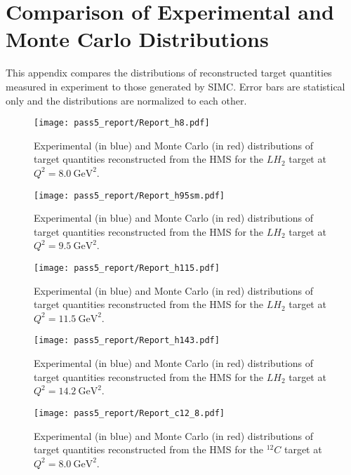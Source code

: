 \chapter{Comparison of Experimental and Monte Carlo Distributions} \label{app:distributions}
This appendix compares the distributions of reconstructed target quantities
measured in experiment to those generated by SIMC.
Error bars are statistical only and the distributions are normalized to each
other.
\begin{figure}[!h]
    \centering
    \texttt{[image: pass5\_report/Report\_h8.pdf]}
    \caption{
            Experimental (in blue) and Monte Carlo (in red) distributions of
            target quantities reconstructed from the HMS for
            the $LH_2$ target at $Q^2=\SI{8.0}{\giga\electronvolt\squared}$.
            }
    \label{fig:Report_h8.pdf_pg1}
\end{figure}


\begin{figure}[!h]
    \centering
    \texttt{[image: pass5\_report/Report\_h95sm.pdf]}
    \caption{
            Experimental (in blue) and Monte Carlo (in red) distributions of
            target quantities reconstructed from the HMS for
            the $LH_2$ target at $Q^2=\SI{9.5}{\giga\electronvolt\squared}$.
            }
    \label{fig:Report_h95sm.pdf_pg1}
\end{figure}


\begin{figure}[!h]
    \centering
    \texttt{[image: pass5\_report/Report\_h115.pdf]}
    \caption{
            Experimental (in blue) and Monte Carlo (in red) distributions of
            target quantities reconstructed from the HMS for
            the $LH_2$ target at $Q^2=\SI{11.5}{\giga\electronvolt\squared}$.
            }
    \label{fig:Report_h115.pdf_pg1}
\end{figure}


\begin{figure}[!h]
    \centering
    \texttt{[image: pass5\_report/Report\_h143.pdf]}
    \caption{
            Experimental (in blue) and Monte Carlo (in red) distributions of
            target quantities reconstructed from the HMS for
            the $LH_2$ target at $Q^2=\SI{14.2}{\giga\electronvolt\squared}$.
            }
    \label{fig:Report_h143.pdf_pg1}
\end{figure}


\begin{figure}[!h]
    \centering
    \texttt{[image: pass5\_report/Report\_c12\_8.pdf]}
    \caption{
            Experimental (in blue) and Monte Carlo (in red) distributions of
            target quantities reconstructed from the HMS for
            the ${}^{12}C$ target at $Q^2=\SI{8.0}{\giga\electronvolt\squared}$.
            }
    \label{fig:Report_c12_8.pdf_pg1}
\end{figure}


